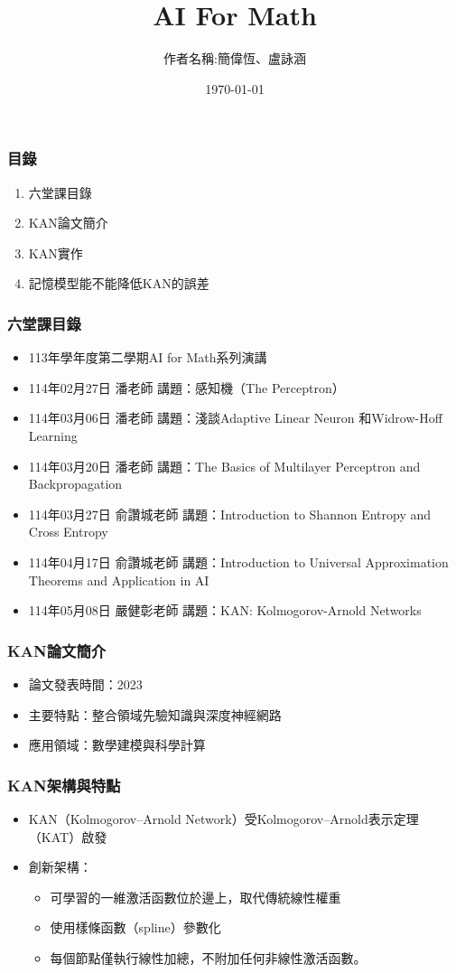 \documentclass{beamer}
\title{AI For Math}
\author{作者名稱:簡偉恆、盧詠涵}
\institute{輔仁大學 數學系 資訊數學組一年級}
\date{\today}
\begin{document}
\frame{\titlepage}

\begin{frame}
    \frametitle{目錄}
    \begin{enumerate}
        \item 六堂課目錄
        \item KAN論文簡介
        \item KAN實作
        \item 記憶模型能不能降低KAN的誤差
    \end{enumerate}
\end{frame}

\begin{frame}
    \frametitle{六堂課目錄}
    \begin{itemize}
        \item 113年學年度第二學期AI for Math系列演講
        \item 114年02月27日 潘老師 講題：感知機（The Perceptron）
        \item 114年03月06日 潘老師 講題：淺談Adaptive Linear Neuron 和Widrow-Hoff Learning
        \item 114年03月20日 潘老師 講題：The Basics of Multilayer Perceptron and Backpropagation
        \item 114年03月27日 俞讚城老師 講題：Introduction to Shannon Entropy and Cross Entropy
        \item 114年04月17日 俞讚城老師 講題：Introduction to Universal Approximation Theorems and Application in AI
        \item 114年05月08日 嚴健彰老師 講題：KAN: Kolmogorov-Arnold Networks
    \end{itemize}
\end{frame}

\begin{frame}
    \frametitle{KAN論文簡介}
    \begin{itemize}
        \item 論文發表時間：2023
        \item 主要特點：整合領域先驗知識與深度神經網路
        \item 應用領域：數學建模與科學計算
    \end{itemize}
\end{frame}

\begin{frame}
    \frametitle{KAN架構與特點}
    \begin{itemize}
        \item KAN（Kolmogorov–Arnold Network）受Kolmogorov–Arnold表示定理（KAT）啟發
        \item 創新架構：
        \begin{itemize}
            \item 可學習的一維激活函數位於邊上，取代傳統線性權重
            \item 使用樣條函數（spline）參數化
            \item 每個節點僅執行線性加總，不附加任何非線性激活函數。
        \end{itemize}
    \end{itemize}
\end{frame}
\end{document}
